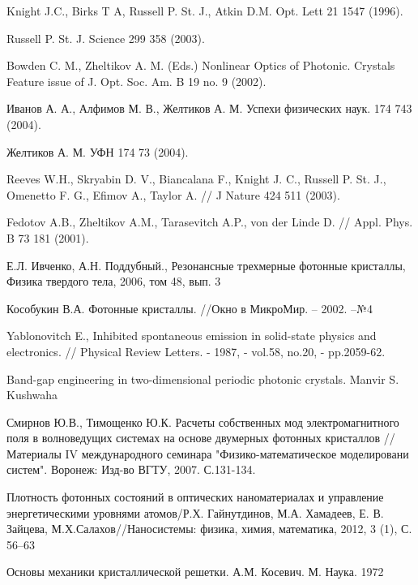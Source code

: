 \clearpage
{}

\begin{thebibliography}{99}

Knight J.C., Birks T A, Russell P. St. J., Atkin D.M.  Opt. Lett 21 1547 (1996).

Russell P. St. J. Science 299 358 (2003).

Bowden C. M., Zheltikov A. M. (Eds.) Nonlinear Optics of Photonic.
Crystals Feature issue of J. Opt. Soc. Am. B 19 no. 9 (2002).

Иванов А. А., Алфимов М. В., Желтиков А. М. Успехи физических наук.
174 743 (2004).

Желтиков А. М. УФН 174 73 (2004).

Reeves W.H., Skryabin D. V., Biancalana F., Knight J. C., Russell P. St. J.,
Omenetto F. G., Efimov A., Taylor A. // J Nature 424 511 (2003).

Fedotov A.B., Zheltikov A.M., Tarasevitch A.P., von der Linde D. // Appl. Phys.
B 73 181 (2001).

Е.Л. Ивченко, А.Н. Поддубный., Резонансные трехмерные фотонные кристаллы,
Физика твердого тела, 2006, том 48, вып. 3

 Кособукин В.А. Фотонные кристаллы. //Окно в МикроМир. -- 2002. --№4

Yablonovitch E., Inhibited spontaneous emission in solid-state
physics and electronics. // Physical Review Letters. - 1987, - vol.58, no.20, -  pp.2059-62.

Band-gap engineering in two-dimensional periodic photonic crystals. Manvir S. Kushwaha

Смирнов Ю.В., Тимощенко Ю.К. Расчеты собственных мод электромагнитного поля в волноведущих системах на основе двумерных фотонных кристаллов // Материалы IV международного семинара "Физико-математическое моделировани систем". Воронеж: Изд-во ВГТУ, 2007. С.131-134.

Плотность фотонных состояний в оптических наноматериалах и управление энергетическими уровнями атомов/Р.Х. Гайнутдинов, М.А. Хамадеев, Е. В. Зайцева, М.Х.Салахов//Наносистемы: физика, химия, математика, 2012, 3 (1), С. 56–63

Основы механики кристаллической решетки. А.М. Косевич. М. Наука. 1972


\end{thebibliography}
